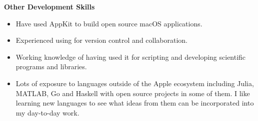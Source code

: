 \textbf{Other Development Skills}
\begin{itemize}[leftmargin=0mm]
\item Have used AppKit to build open source macOS applications.
\item Experienced using  for version control and collaboration.
\item Working knowledge of  having used it for scripting and
  developing scientific programs and libraries.
\item Lots of exposure to languages outside of the Apple ecosystem including
  Julia, \mbox{MATLAB}, Go and Haskell with open source projects in some of
  them. I like learning new languages to see what ideas from them can be
  incorporated into my day-to-day work.
\end{itemize}

